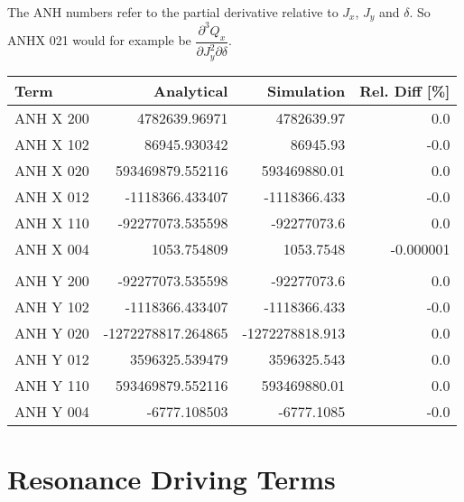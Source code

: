 The ANH numbers refer to the partial derivative relative to \(J_x\),
\(J_y\) and \(\delta\). So ANHX 021 would for example be
\(\dfrac{\partial^3 Q_x}{\partial J_y^2 \partial \delta}\).

\begin{center}
\begin{tabular}{lrrr}
\toprule
       Term &         Analytical &      Simulation & Rel. Diff [\%] \\
\midrule
  ANH X 200 &      4782639.96971 &      4782639.97 &           0.0 \\
  ANH X 102 &       86945.930342 &        86945.93 &          -0.0 \\
  ANH X 020 &   593469879.552116 &    593469880.01 &           0.0 \\
  ANH X 012 &    -1118366.433407 &    -1118366.433 &          -0.0 \\
  ANH X 110 &   -92277073.535598 &     -92277073.6 &           0.0 \\
  ANH X 004 &        1053.754809 &       1053.7548 &     -0.000001 \\
            &                    &                 &               \\
  ANH Y 200 &   -92277073.535598 &     -92277073.6 &           0.0 \\
  ANH Y 102 &    -1118366.433407 &    -1118366.433 &          -0.0 \\
  ANH Y 020 & -1272278817.264865 & -1272278818.913 &           0.0 \\
  ANH Y 012 &     3596325.539479 &     3596325.543 &           0.0 \\
  ANH Y 110 &   593469879.552116 &    593469880.01 &           0.0 \\
  ANH Y 004 &       -6777.108503 &      -6777.1085 &          -0.0 \\
\bottomrule
\end{tabular}
\end{center}



\chapter{Resonance Driving Terms}
\label{appendix:rdts}
\thumbforappendix


